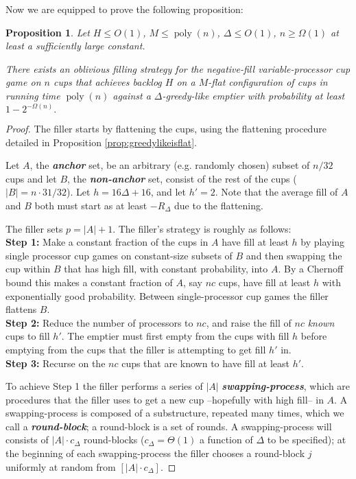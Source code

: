 \documentclass[twocolumn]{article}[10pt]
\newcommand{\defn}[1]{{\textit{\textbf{\boldmath #1}}}\xspace}
\DeclareMathOperator{\poly}{\text{poly}}
\newtheorem{proposition}{Proposition}
\begin{document}
Now we are equipped to prove the following proposition:
\begin{proposition}
  \label{prop:obliviousBase}
  Let $H \le O(1)$, $M \le \poly(n)$, $\Delta \le O(1)$, $n \ge \Omega(1)$ at
  least a sufficiently large constant. 

  There exists an oblivious filling strategy for the negative-fill
  variable-processor cup game on $n$ cups that achieves backlog $H$ on a
  $M$-flat configuration of cups in running time $\poly(n)$ against a
  $\Delta$-greedy-like emptier with probability at least $1-2^{-\Omega(n)}.$
\end{proposition}
\begin{proof}
  The filler starts by flattening the cups, using the flattening procedure
  detailed in Proposition \ref{prop:greedylikeisflat}. 

  Let $A$, the \defn{anchor} set, be an arbitrary (e.g. randomly chosen) subset
  of $n/32$ cups and let $B$, the \defn{non-anchor} set, consist of the rest of
  the cups ($|B| = n\cdot 31/32$). Let $h = 16\Delta + 16$, and let $h' = 2$. Note that
  the average fill of $A$ and $B$ both must start as at least $-R_\Delta$ due
  to the flattening.

  The filler sets $p=|A|+1$. The filler's strategy is roughly as follows: \\
  \textbf{Step 1:} Make a constant fraction of the cups in $A$ have fill at
  least $h$ by playing single processor cup games on constant-size subsets of
  $B$ and then swapping the cup within $B$ that has high fill, with constant
  probability, into $A$. By a Chernoff bound this makes a constant fraction of
  $A$, say $nc$ cups, have fill at least $h$ with exponentially good
  probability. Between single-processor cup games the filler flattens $B$.\\
  \textbf{Step 2:} Reduce the number of processors to $nc$, and raise the fill
  of $nc$ \emph{known} cups to fill $h'$. The emptier must first empty from the
  cups with fill $h$ before emptying from the cups that the filler is
  attempting to get fill $h'$ in.\\
  \textbf{Step 3:} Recurse on the $nc$ cups that are known to have fill at
  least $h'$.

To achieve Step 1 the filler performs a series of $|A|$ \defn{swapping-process},
which are procedures that the filler uses to get a new cup --hopefully with
high fill-- in $A$. A swapping-process is composed of a substructure, repeated
many times, which we call a \defn{round-block}; a round-block is a set of
rounds. A swapping-process will consists of $|A|\cdot c_\Delta$ round-blocks
($c_\Delta = \Theta(1)$ a function of $\Delta$ to be specified); at the beginning
of each swapping-process the filler chooses a round-block $j$ uniformly at
random from $[|A|\cdot c_\Delta]$. 


\end{proof}
\end{document}
